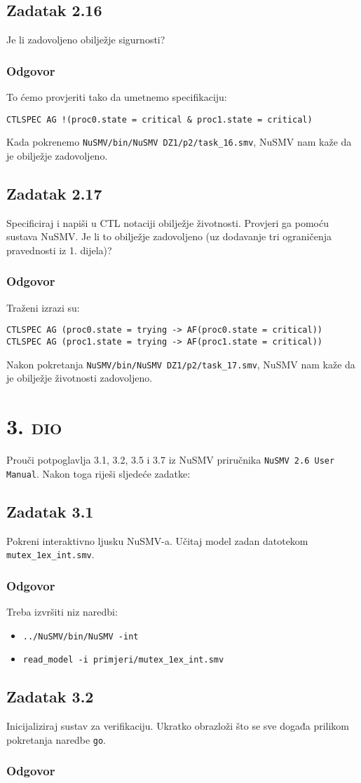 \documentclass{article}
\newcommand{\sekcija}[1]{\section{\textsc{#1}}}
\newcommand{\dio}[1]{\sekcija{#1. dio}}
\newcommand{\zadatak}[1]{\subsection{Zadatak #1}}
\newcommand{\odgovor}{\subsubsection*{Odgovor}}
\newcommand{\code}[1]{\colorbox{blue!11}{\texttt{#1}}}
\begin{document}
\zadatak{2.16}

Je li zadovoljeno obilježje sigurnosti?

\odgovor

To ćemo provjeriti tako da umetnemo specifikaciju:

\begin{verbatim}
CTLSPEC AG !(proc0.state = critical & proc1.state = critical)
\end{verbatim}

\noindent
Kada pokrenemo \code{NuSMV/bin/NuSMV DZ1/p2/task\_16.smv}, NuSMV nam kaže da je obilježje zadovoljeno.


\zadatak{2.17}

Specificiraj i napiši u CTL notaciji obilježje životnosti. Provjeri ga pomoću sustava NuSMV. Je li to obilježje zadovoljeno (uz dodavanje tri ograničenja pravednosti iz 1. dijela)?

\odgovor

Traženi izrazi su:

\begin{verbatim}
CTLSPEC AG (proc0.state = trying -> AF(proc0.state = critical))
CTLSPEC AG (proc1.state = trying -> AF(proc1.state = critical))
\end{verbatim}

\noindent
Nakon pokretanja \code{NuSMV/bin/NuSMV DZ1/p2/task\_17.smv}, NuSMV nam kaže da je obilježje životnosti zadovoljeno.
\pagebreak


\dio{3}

Prouči potpoglavlja 3.1, 3.2, 3.5 i 3.7 iz NuSMV priručnika \code{NuSMV 2.6 User Manual}. Nakon toga riješi sljedeće zadatke:

\zadatak{3.1}

Pokreni interaktivno ljusku NuSMV-a. Učitaj model zadan datotekom \code{mutex\_1ex\_int.smv}.

\odgovor

Treba izvršiti niz naredbi:

\begin{itemize}
    \item \code{../NuSMV/bin/NuSMV -int}
    \item \code{read\_model -i primjeri/mutex\_1ex\_int.smv}
\end{itemize}


\zadatak{3.2}

Inicijaliziraj sustav za verifikaciju. Ukratko obrazloži što se sve događa prilikom pokretanja naredbe \code{go}.

\odgovor
\end{document}
